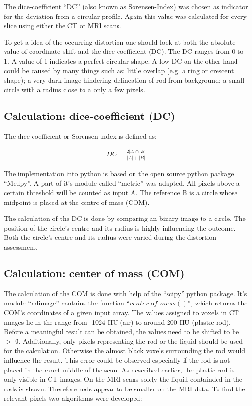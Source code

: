 
The dice-coefficient ``DC'' (also known as Sorensen-Index) was chosen as indicator for the deviation from a circular profile. Again this value was calculated for every slice using either the CT or MRI scans.

To get a idea of the occurring distortion one should look at both the absolute value of coordinate shift and the dice-coefficient (DC).
The DC ranges from 0 to 1. A value of 1 indicates a perfect circular shape. A low DC on the other hand could be caused by many things such as:
little overlap (e.g. a ring or crescent shape); a very dark image hindering delineation of rod from background; a small circle with a radius close to a only a few pixels.



\subsection{Calculation: dice-coefficient (DC)}

The dice coefficient or Sorensen index \cite{MedPy_dc-doc} is defined as:

\begin{align}
DC = \frac{2 |A \, \cap \, B|}{|A| + |B|}
\end{align}

The implementation into python is based on the open source python package ``Medpy''. \cite{MedPy} A part of it's module called ``metric'' was adapted. \cite{MedPy_dc-code}
All pixels above a certain threshold will be counted as input A. The reference B is a circle whose midpoint is placed at the centre of mass (COM).

The calculation of the DC is done by comparing an binary image to a circle. The position of the circle's centre and its radius is highly influencing the outcome.
Both the circle's centre and its radius were varied during the distortion assessment.


\subsection{Calculation: center of mass (COM)}

The calculation of the COM is done with help of the ``scipy'' python package.
It's module ``ndimage'' contains the function ``$center\_of\_mass()$'', which returns the COM's coordinates of a given input array.
The values assigned to voxels in CT images lie in the range from -1024 HU (air) to around 200 HU (plastic rod).
Before a meaningful result can be obtained, the values need to be shifted to be $>$ 0.
Additionally, only pixels representing the rod or the liquid should be used for the calculation.
Otherwise the almost black voxels surrounding the rod would influence the result.
This error could be observed especially if the rod is not placed in the exact middle of the scan.
As described earlier, the plastic rod is only visible in CT images. On the MRI scans solely the liquid containded in the rods is shown. Therefore rods appear to be smaller on the MRI data.
To find the relevant pixels two algorithms were developed:

